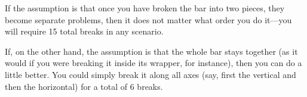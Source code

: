 \begin{comment}
It is easiest to consider this problem when there are only two
inhabitants---then each of the two inhabitants knows there are two eye colors, and knows
the other inhabitant's eye color, and can can therefore immediately infer his own.

Now consider the case where there are three inhabitants. Two must have one
color, say brown, and the other must have blue eyes. The blue-eyed inhabitant realizes
that his eyes must be blue since he knows the others have brown eyes.
He will kill himself at midnight, and therefore, not appear the next day. The two brown-eyed
inhabitants can infer that their own eye color must be brown for the
blue-eyed inhabitant to have inferred his own color, and they will kill themselves.

For the case of four inhabitants, if there are three  with one color, and one with the other,
the latter will infer his color, and then the first three will know that they all had
the same color.  If there are two of each color, then all will be alive the 
next day, and therefore each knows that his color cannot be the same as the two
who have a common color.  Proceeding inductively, if there are $2N$ inhabitants, 
they will all kill themselves on the $N$-th day.

For the second part of the question, the new knowledge injected by
the explorer is subtle. For the case $N=3$ with one blue-eyed and two 
brown-eyed inhabitants, the explorer is telling the inhabitants with blue-eyes
something new. For the case $N=4$,  with two inhabitants of each color, the explorer is telling
the inhabitants that the others know that there are two colors (which would
not be the case if 3 had one color since the remaining inhabitant could have
the same color).
\end{comment} 

If the assumption is that once you have broken the bar into two pieces, they become separate 
problems, then it does not matter what order you do it---you will require 15 total breaks in 
any scenario.

If, on the other hand, the assumption is that the whole bar stays together (as it would if 
you were breaking it inside its wrapper, for instance), then you can do a little better. 
You could simply break it along all axes (say, first the vertical and then the horizontal) 
for a total of 6 breaks.


